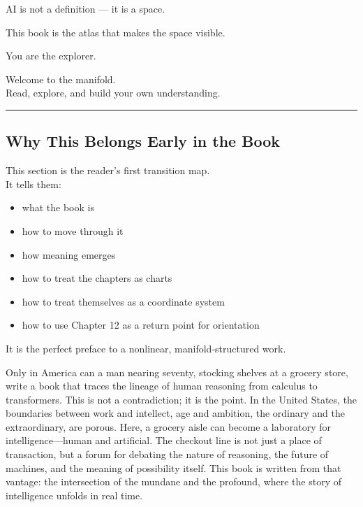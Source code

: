 \documentclass[
]{article}
\providecommand{\tightlist}{%
  \setlength{\itemsep}{0pt}\setlength{\parskip}{0pt}}
\begin{document}
AI is not a definition --- it is a space.

This book is the atlas that makes the space visible.

You are the explorer.

Welcome to the manifold.\\
Read, explore, and build your own understanding.

\begin{center}\rule{0.5\linewidth}{0.5pt}\end{center}

\hypertarget{why-this-belongs-early-in-the-book}{%
\subsection{Why This Belongs Early in the
Book}\label{why-this-belongs-early-in-the-book}}

This section is the reader's first transition map.\\
It tells them:

\begin{itemize}
\tightlist
\item
  what the book is
\item
  how to move through it
\item
  how meaning emerges
\item
  how to treat the chapters as charts
\item
  how to treat themselves as a coordinate system
\item
  how to use Chapter 12 as a return point for orientation
\end{itemize}

It is the perfect preface to a nonlinear, manifold‑structured work.

Only in America can a man nearing seventy, stocking shelves at a grocery
store, write a book that traces the lineage of human reasoning from
calculus to transformers. This is not a contradiction; it is the point.
In the United States, the boundaries between work and intellect, age and
ambition, the ordinary and the extraordinary, are porous. Here, a
grocery aisle can become a laboratory for intelligence---human and
artificial. The checkout line is not just a place of transaction, but a
forum for debating the nature of reasoning, the future of machines, and
the meaning of possibility itself. This book is written from that
vantage: the intersection of the mundane and the profound, where the
story of intelligence unfolds in real time.
\end{document}
